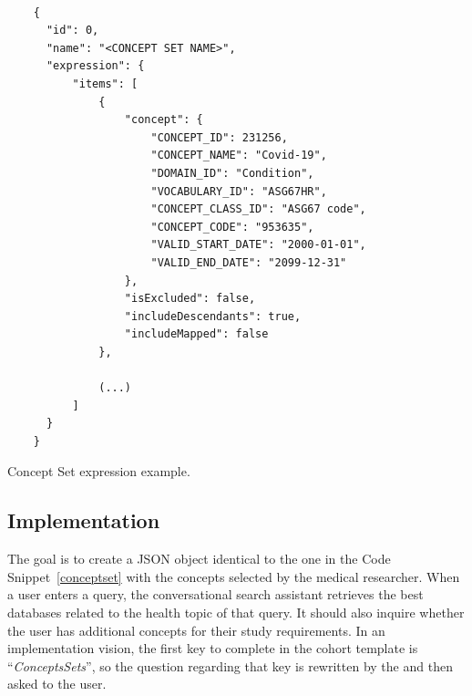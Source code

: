 \begin{listing}[H]
  \begin{verbatim}
      
    {
      "id": 0,
      "name": "<CONCEPT SET NAME>",
      "expression": {
          "items": [
              {
                  "concept": {
                      "CONCEPT_ID": 231256,
                      "CONCEPT_NAME": "Covid-19",
                      "DOMAIN_ID": "Condition",
                      "VOCABULARY_ID": "ASG67HR",
                      "CONCEPT_CLASS_ID": "ASG67 code",
                      "CONCEPT_CODE": "953635",
                      "VALID_START_DATE": "2000-01-01",
                      "VALID_END_DATE": "2099-12-31"
                  },
                  "isExcluded": false,
                  "includeDescendants": true,
                  "includeMapped": false
              },
              
              (...)
          ]
      }
    }

  \end{verbatim}
\caption[Concept Set expression example]{Concept Set expression example.}
\label{conceptset}
\end{listing}  



\subsection{Implementation}




The goal is to create a JSON object identical to the one in the Code Snippet~\ref{conceptset} with the concepts selected by the medical researcher. When a user enters a query, the conversational search assistant retrieves the best databases related to the health topic of that query. It should also inquire whether the user has additional concepts for their study requirements. In an implementation vision, the first key to complete in the cohort template is ``\textit{ConceptsSets}'', so the question regarding that key is rewritten by the {\llm} and then asked to the user.

